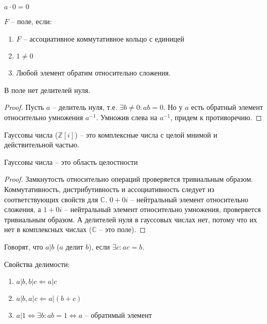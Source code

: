 \documentclass[document.tex]{subfiles}
\begin{document}
\begin{exercise}
$a \cdot 0 = 0$
\end{exercise}

\begin{definition}
$F$ -- поле, если:
\begin{enumerate}
\item $F$ -- ассоциативное коммутативное кольцо с единицей
\item $1 \neq 0$
\item Любой элемент обратим относительно сложения.
\end{enumerate}
\end{definition}

\begin{statement}
В поле нет делителей нуля.
\end{statement}
\begin{proof}
Пусть $a$ -- делитель нуля, т.е. $\exists b \neq 0 : ab = 0$. Но у $a$ есть обратный элемент относительно умножения $a^{-1}$. Умножив слева на $a^{-1}$, придем к противоречию.
\end{proof}

\begin{definition}
Гауссовы числа ($\mathbb{Z}[i]$) -- это комплексные числа с целой мнимой и действительной частью.
\end{definition}

\begin{statement}
Гауссовы числа -- это область целостности
\end{statement}
\begin{proof}
Замкнутость относительно операций проверяется тривиальным образом. Коммутативность, дистрибутивность и ассоциативность следует из соответствующих свойств для $\mathbb{C}$. $0 + 0i$ -- нейтральный элемент относительно сложения, а $1 + 0i$ -- нейтральный элемент относительно умножения, проверяется тривиальным образом. А делителей нуля в гауссовых числах нет, потому что их нет в комплексных числах ($\mathbb{C}$ -- это поле).
\end{proof}

\begin{definition}
Говорят, что $a|b$ ($a$ делит $b$), если $\exists c : ac = b$.
\end{definition}

\begin{statement}
Свойства делимости:
\begin{enumerate}
\item $a|b, b|c \Leftarrow a|c$
\item $a|b, a|c \Leftarrow a|(b+c)$
\item $a|1 \Leftrightarrow \exists b: ab = 1 \Leftrightarrow a \text{ -- обратимый элемент }$
\end{enumerate}
\end{statement}
\end{document}
